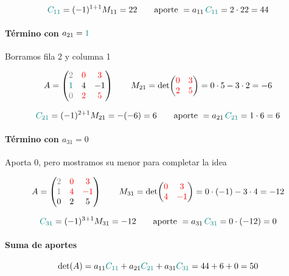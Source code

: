 \documentclass{article}
\begin{document}
\[
{\color{teal}{C_{11}}}=(-1)^{1+1}M_{11}=22
\qquad
\text{aporte }=a_{11}\,{\color{teal}{C_{11}}}=2\cdot 22=44
\]

\paragraph*{Término con \(a_{21}={\color{teal}1}\)}
Borramos fila 2 y columna 1

\[
A=
\begin{pmatrix}
{\color{gray}2} & {\color{red}0} & {\color{red}3}\\
{\color{teal}1} & 4 & -1\\
{\color{gray}0} & {\color{red}2} & {\color{red}5}
\end{pmatrix}
\qquad
M_{21}=\det\!\begin{pmatrix}{\color{red}0} & {\color{red}3}\\ {\color{red}2} & {\color{red}5}\end{pmatrix}
=0\cdot 5-3\cdot 2=-6
\]

\[
{\color{teal}{C_{21}}}=(-1)^{2+1}M_{21}=-(-6)=6
\qquad
\text{aporte }=a_{21}\,{\color{teal}{C_{21}}}=1\cdot 6=6
\]

\paragraph*{Término con \(a_{31}=0\)}
Aporta \(0\), pero mostramos su menor para completar la idea

\[
A=
\begin{pmatrix}
{\color{gray}2} & {\color{red}0} & {\color{red}3}\\
{\color{gray}1} & {\color{red}4} & {\color{red}-1}\\
0 & 2 & 5
\end{pmatrix}
\qquad
M_{31}=\det\!\begin{pmatrix}{\color{red}0} & {\color{red}3}\\ {\color{red}4} & {\color{red}-1}\end{pmatrix}
=0\cdot(-1)-3\cdot 4=-12
\]

\[
{\color{teal}{C_{31}}}=(-1)^{3+1}M_{31}=-12
\qquad
\text{aporte }=a_{31}\,{\color{teal}{C_{31}}}=0\cdot(-12)=0
\]

\paragraph*{Suma de aportes}
\[
\det(A)=a_{11}{\color{teal}{C_{11}}}+a_{21}{\color{teal}{C_{21}}}+a_{31}{\color{teal}{C_{31}}}=44+6+0=50
\]
\end{document}
